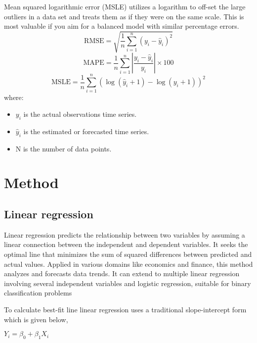 \documentclass{ieeeojies}
\begin{document}
Mean squared logarithmic error (MSLE)  utilizes a logarithm to off-set the large outliers in a data set and treats them as if they were on the same scale. This is most valuable if you aim for a balanced model with similar percentage errors.\cite{r13}
\begin{equation*}
    \text{RMSE} = \sqrt{\frac{1}{n} \sum_{i=1}^{n} (y_i - \hat{y}_i)^2}
\end{equation*}
\begin{equation*}
    \text{MAPE} = \frac{1}{n} \sum_{i=1}^{n} \left| \frac{y_i - \hat{y}_i}{y_i} \right| \times 100
\end{equation*}
\begin{equation*}
    \text{MSLE} = \frac{1}{n} \sum_{i=1}^{n} (\log(\hat{y}_i + 1) - \log(y_i + 1))^2
\end{equation*}
where:
    \begin{itemize}
        \item \(y_i\) is the actual observations time series.
        \item \(\hat{y}_i\) is the estimated or forecasted time series.
        \item N is the number of data points.
    \end{itemize}




\section{Method}

\subsection{Linear regression}
Linear regression predicts the relationship between two variables by assuming a linear connection between the independent and dependent variables. It seeks the optimal line that minimizes the sum of squared differences between predicted and actual values. Applied in various domains like economics and finance, this method analyzes and forecasts data trends. It can extend to multiple linear regression involving several independent variables and logistic regression, suitable for binary classification problems \cite{r7}

To calculate best-fit line linear regression uses a traditional slope-intercept form which is given below,
\begin{center}
    \(Y_i = \beta_0 + \beta_1 X_i\)
\end{center}
\end{document}
